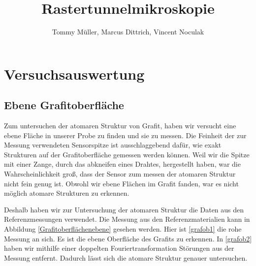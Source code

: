\documentclass[10pt,a4paper]{article}
\author{Tommy Müller, Marcus Dittrich, Vincent Noculak}
\title{Rastertunnelmikroskopie}
\begin{document}
\maketitle
\newpage
\tableofcontents
\newpage

\section{Versuchsauswertung}

\subsection{Ebene Grafitoberfläche}

Zum untersuchen der atomaren Struktur von Grafit, haben wir versucht eine ebene Fläche in unserer Probe zu finden und sie zu messen. Die Feinheit der zur Messung verwendeten Sensorspitze ist ausschlaggebend dafür, wie exakt Strukturen auf der Grafitoberfläche gemessen werden können. Weil wir die Spitze mit einer Zange, durch das abkneifen eines Drahtes, hergestellt haben, war die Wahrscheinlichkeit groß, dass der Sensor zum messen der atomaren Struktur nicht fein genug ist. Obwohl wir ebene Flächen im Grafit fanden, war es nicht möglich atomare Strukturen zu erkennen.

 Deshalb haben wir zur Untersuchung der atomaren Struktur die Daten aus den Referenzmessungen verwendet. Die Messung aus den Referenzmaterialien kann in Abbildung \ref{Grafitoberflächenebene} gesehen werden. Hier ist \ref{grafob1} die rohe Messung an sich. Es ist die ebene Oberfläche des Grafits zu erkennen. In \ref{grafob2} haben wir mithilfe einer doppelten Fouriertransformation Störungen aus der Messung entfernt. Dadurch lässt sich die atomare Struktur genauer untersuchen.
\end{document}
